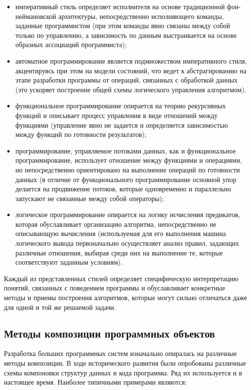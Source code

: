 \begin{itemize}
    \item императивный стиль определяет исполнителя на основе традиционной фон-неймановской архитектуры, непосредственно исполняющего команды, заданные программистом (при этом команды явно связаны между собой только по управлению, а зависимость по данным выстраивается на основе образных ассоциаций программиста);
    \item автоматное программирование является подмножеством императивного стиля, акцентируясь при этом на модели состояний, что ведет к абстрагированию на этапе разработки программы от операций, связанных с обработкой данных (это ускоряет построение общей схемы логического управления алгоритмом).
    \item функциональное программирование опирается на теорию рекурсивных функций и описывает процесс управления в виде отношений между функциями (управление явно не задается и определяется зависимостью между функций по готовности результатов);
    \item программирование, управляемое потоками данных, как и функциональное программирование, использует отношение между функциями и операциями, но непосредственно ориентировано на выполнение операций по готовности данных (в отличие от функционального программирование основной упор делается на продвижение потоков, которые одновременно и параллельно запускают не связанные между собой операторы);
    \item логическое программирование опирается на логику исчисления предикатов, которая обуславливает организацию алгоритма, непосредственно не описывающую вычисления (используемая для его выполнения машина логического вывода первоначально осуществляет анализ правил, задающих различные отношения, выбирая среди них на выполнение те, которые соответствуют заданным условиям).

\end{itemize}

Каждый из представленных стилей определяет специфическую интерпретацию понятий, связанных с поведением программы и обуславливает конкретные методы и приемы построения алгоритмов, которые могут сильно отличаться даже для одной и той же решаемой задачи.


\subsection{Методы композиции программных объектов}

Разработка больших программных систем изначально опиралась на различные методы композиции. В ходе исторического развития были опробованы различные схемы компоновки структур данных и кода программы. Ряд их используется и в настоящее время. Наиболее типичными примерами являются:

